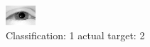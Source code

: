 \begin{figure}[h!]
\begin{center}
\includegraphics[width=0.60\columnwidth]{figures/ID2262_class_1_target_2.png}
\end{center}
\caption{ Classification: 1 actual target: 2}
\label{fig:ID2262_class_1_target_2}
\end{figure}
